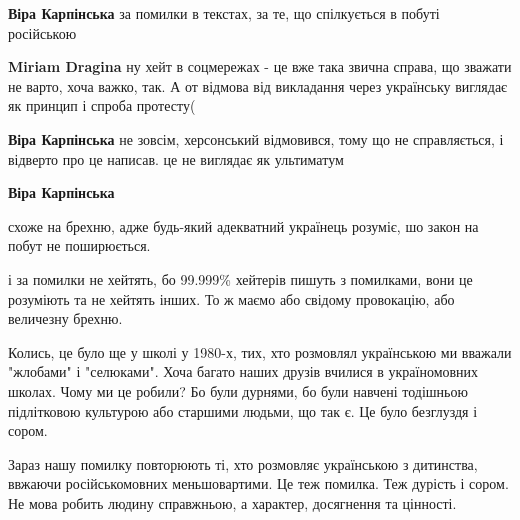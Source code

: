 \begin{itemize}
\begin{itemize}
\textbf{Віра Карпінська} за помилки в текстах, за те, що спілкується в побуті російською

 
\textbf{Miriam Dragina} ну хейт в соцмережах - це вже така звична справа, що зважати не варто, хоча важко, так. А от відмова від викладання через українську виглядає як принцип і спроба протесту(

 
\textbf{Віра Карпінська} не зовсім, херсонський відмовився, тому що не справляється, і відверто про це написав. це не виглядає як ультиматум

 
\textbf{Віра Карпінська} 

схоже на брехню, адже будь-який адекватний українець розуміє, шо закон на побут
не поширюється.

і за помилки не хейтять, бо 99.999\% хейтерів пишуть з помилками, вони це
розуміють та не хейтять інших. То ж маємо або свідому провокацію, або величезну
брехню.

\end{itemize}


Колись, це було ще у школі у 1980-х, тих, хто розмовлял українською ми вважали
"жлобами" і "селюками". Хоча багато наших друзів вчилися в україномовних
школах. Чому ми це робили? Бо були дурнями, бо були навчені тодішньою
підлітковою культурою або старшими людьми, що так є. Це було безглуздя і сором.

Зараз нашу помилку повторюють ті, хто розмовляє українською з дитинства,
ввжаючи російськомовних меньшовартими. Це теж помилка. Теж дурість і сором. Не
мова робить людину справжньою, а характер, досягнення та цінності.



\end{itemize}
